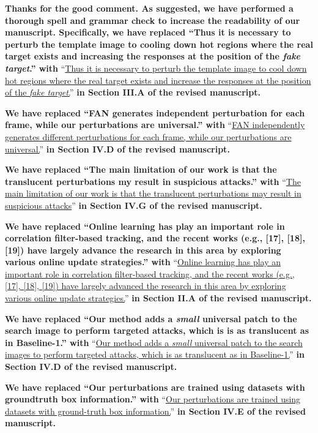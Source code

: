 \documentclass[12pt]{article}
\begin{document}
\textbf{Thanks for the good comment. As suggested, we have performed a thorough spell and grammar check to increase the readability of our manuscript. Specifically, we have replaced ``Thus it is necessary to perturb the template image to cooling down hot regions where the real target exists and increasing the responses at the position of the \textit{fake target}.'' with} ``\uline{Thus it is necessary to perturb the template image to cool down hot regions where the real target exists and increase the responses at the position of the \textit{fake target}.}''
\textbf{in Section III.A of the revised manuscript.}

\textbf{We have replaced ``FAN generates independent perturbation for each frame, while our perturbations are universal.'' with} ``\uline{FAN independently generates different perturbations for each frame, while our perturbations are universal.}'' \textbf{in Section IV.D of the revised manuscript.}

\textbf{We have replaced ``The main limitation of our work is that the translucent perturbations my result in suspicious attacks.'' with} ``\uline{The main limitation of our work is that the translucent perturbations may result in suspicious attacks}'' \textbf{in Section IV.G of the revised manuscript.}

\textbf{We have replaced ``Online learning has play an important role in correlation filter-based tracking, and the recent works (e.g., [17], [18], [19]) have largely advance the research in this area by exploring various online update strategies.'' with} ``\uline{Online learning has play an important role in correlation filter-based tracking, and the recent works (e.g., [17], [18], [19]) have largely advanced the research in this area by exploring various online update strategies.}'' \textbf{in Section II.A of the revised manuscript.}

\textbf{We have replaced ``Our method adds a \textit{small} universal patch to the search image to perform targeted attacks, which is is as translucent as in Baseline-1.'' with} ``\uline{Our method adds a \textit{small} universal patch to the search images to perform targeted attacks, which is as translucent as in Baseline-1.}'' \textbf{in Section IV.D of the revised manuscript.}

\textbf{We have replaced ``Our perturbations are trained using datasets with groundtruth box information.'' with} ``\uline{Our perturbations are trained using datasets with ground-truth box information.}'' \textbf{in Section IV.E of the revised manuscript.}
\end{document}
